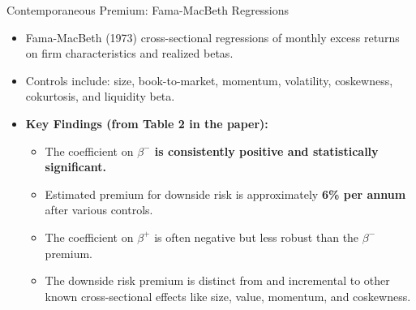 \documentclass[10pt]{beamer}
\begin{document}
\begin{frame}{Contemporaneous Premium: Fama-MacBeth Regressions}
    \begin{itemize}
        \item Fama-MacBeth (1973) cross-sectional regressions of monthly excess returns on firm characteristics and realized betas.
        \item Controls include: size, book-to-market, momentum, volatility, coskewness, cokurtosis, and liquidity beta.
        \item \textbf{Key Findings (from Table 2 in the paper):}
        \begin{itemize}
            \item The coefficient on \textbf{$\beta^{-}$ is consistently positive and statistically significant.}
            \item Estimated premium for downside risk is approximately \textbf{6\% per annum} after various controls.
            \item The coefficient on $\beta^{+}$ is often negative but less robust than the $\beta^{-}$ premium.
            \item The downside risk premium is distinct from and incremental to other known cross-sectional effects like size, value, momentum, and coskewness.
        \end{itemize}
    \end{itemize}
\end{frame}
\end{document}
